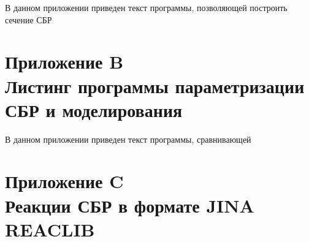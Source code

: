 \documentclass[14pt, a4paper]{article}
\numberwithin{figure}{section}
\numberwithin{equation}{section}
\begin{document}
В данном приложении приведен текст программы, позволяющей построить сечение СБР



\newpage
{}
\section*{Приложение B\\Листинг программы параметризации СБР и моделирования}\label{attachB}

В данном приложении приведен текст программы, сравнивающей 



\newpage
{}
\section*{Приложение C\\Реакции СБР в формате JINA REACLIB}\label{attachC}


\end{document}
